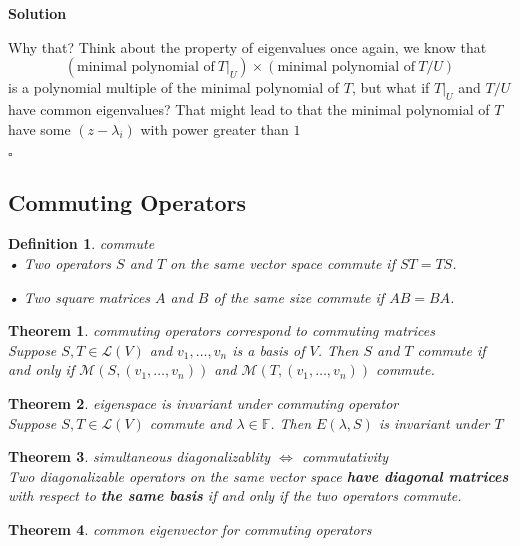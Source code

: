 \documentclass{article}
\newtheorem{theorem}{Theorem}[subsection]
\newtheorem{definition}{Definition}[subsection]
\newenvironment{solution}{%
{
    \textbf{Solution\\}
    }
}{
  \hfill $\square$ 
  \par\bigskip 
}
\newcommand{\FF}{\mathbb{F}}
\begin{document}
\begin{CJK}{UTF8}{gkai}
\begin{solution}
    Why that? Think about the property of eigenvalues once again, we know that
    \[(\text{minimal polynomial of}~ T|_U) \times (\text{minimal polynomial of}~ T/U)\]
    is a polynomial multiple of the minimal polynomial of $T$, but what if $T|_U$ and $T/U$ have common eigenvalues? That might lead to that the minimal polynomial of $T$ have some $(z - \lambda_i)$ with power greater than $1$
\end{solution}

\subsection{Commuting Operators}
\begin{definition}
    commute\\

    • Two operators $S$ and $T$ on the same vector space commute if $ST = TS$.

    • Two square matrices $A$ and $B$ of the same size commute if $AB = BA$.
\end{definition}

\begin{theorem}
    commuting operators correspond to commuting matrices\\

    Suppose $S,T \in \mathcal{L}(V)$ and $v_1,\ldots,v_n$ is a basis of $V$. Then $S$ and $ T$ commute if and only if $\mathcal{M}(S,(v_1,\ldots,v_n))$ and $\mathcal{M}(T,(v_1,\ldots,v_n))$ commute.

\end{theorem}

\begin{theorem}
    eigenspace is invariant under commuting operator\\
    
    Suppose $S,T \in \mathcal{L}(V)$ commute and $\lambda \in \FF$. Then $E (\lambda,S)$ is invariant under $T$
\end{theorem}

\begin{theorem}
    simultaneous diagonalizablity $\Leftrightarrow$ commutativity\\

    Two diagonalizable operators on the same vector space \textbf{have diagonal matrices} with respect to \textbf{the same basis} if and only if the two operators commute.
\end{theorem}

\begin{theorem}
    common eigenvector for commuting operators\\


\end{theorem}
\end{CJK}
\end{document}
